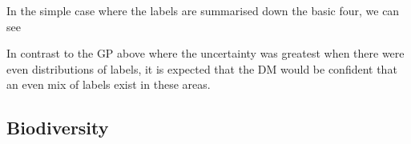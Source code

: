 In the simple case where the labels are summarised down the basic four, we can see 

In contrast to the GP above where the uncertainty was greatest when there were even distributions of labels, it is expected that the DM would be confident that an even mix of labels exist in these areas. 

\subsection{Biodiversity}
